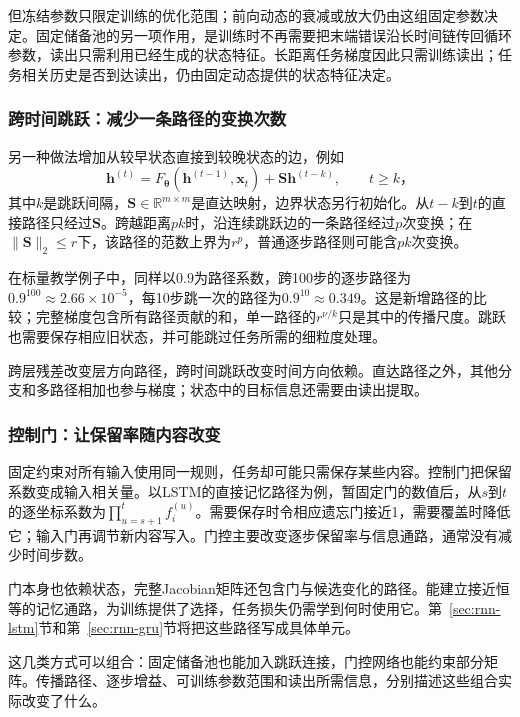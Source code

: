 但冻结参数只限定训练的优化范围；前向动态的衰减或放大仍由这组固定参数决定。固定储备池的另一项作用，是训练时不再需要把末端错误沿长时间链传回循环参数，读出只需利用已经生成的状态特征。长距离任务梯度因此只需训练读出；任务相关历史是否到达读出，仍由固定动态提供的状态特征决定。

\subsubsection{跨时间跳跃：减少一条路径的变换次数}
\label{sec:rnn-temporal-skips}

另一种做法增加从较早状态直接到较晚状态的边，例如
\begin{equation}
  \bm h^{(t)}=F_{\bm\theta}(\bm h^{(t-1)},\bm x_t)
       +\bm S\bm h^{(t-k)},\qquad t\geq k\text{，}
  \label{eq:rnn-temporal-skip}
\end{equation}
其中$k$是跳跃间隔，$\bm S\in\mathbb R^{m\times m}$是直达映射，边界状态另行初始化。从$t-k$到$t$的直接路径只经过$\bm S$。跨越距离$pk$时，沿连续跳跃边的一条路径经过$p$次变换；在$\lVert\bm S\rVert_2\leq r$下，该路径的范数上界为$r^p$，普通逐步路径则可能含$pk$次变换。

在标量教学例子中，同样以$0.9$为路径系数，跨100步的逐步路径为$0.9^{100}\approx2.66\times10^{-5}$，每10步跳一次的路径为$0.9^{10}\approx0.349$。这是新增路径的比较；完整梯度包含所有路径贡献的和，单一路径的$r^{\nu/k}$只是其中的传播尺度。跳跃也需要保存相应旧状态，并可能跳过任务所需的细粒度处理。

跨层残差改变层方向路径，跨时间跳跃改变时间方向依赖。直达路径之外，其他分支和多路径相加也参与梯度；状态中的目标信息还需要由读出提取。

\subsubsection{控制门：让保留率随内容改变}
\label{sec:rnn-gated-memory-path}

固定约束对所有输入使用同一规则，任务却可能只需保存某些内容。控制门把保留系数变成输入相关量。以LSTM的直接记忆路径为例，暂固定门的数值后，从$s$到$t$的逐坐标系数为$\prod_{u=s+1}^{t}f_i^{(u)}$。需要保存时令相应遗忘门接近1，需要覆盖时降低它；输入门再调节新内容写入。门控主要改变逐步保留率与信息通路，通常没有减少时间步数。

门本身也依赖状态，完整Jacobian矩阵还包含门与候选变化的路径。能建立接近恒等的记忆通路，为训练提供了选择，任务损失仍需学到何时使用它。第~\ref{sec:rnn-lstm}节和第~\ref{sec:rnn-gru}节将把这些路径写成具体单元。

这几类方式可以组合：固定储备池也能加入跳跃连接，门控网络也能约束部分矩阵。传播路径、逐步增益、可训练参数范围和读出所需信息，分别描述这些组合实际改变了什么。


